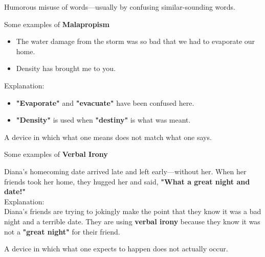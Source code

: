 \begin{definition}[Malapropism]
    Humorous misuse of words—usually by confusing similar-sounding words.
\end{definition}

\begin{example}
    Some examples of \textbf{Malapropism}
    
    \begin{itemize}
        \item The water damage from the storm was so bad that we had to evaporate our home.
        \item Density has brought me to you. \\
    \end{itemize}
    
    Explanation: \\
    
    \begin{itemize}
        \item \textbf{"Evaporate"} and \textbf{"evacuate"} have been confused here.
        \item \textbf{"Density"} is used when \textbf{"destiny"} is what was meant.
    \end{itemize}
\end{example}

\begin{definition}
    A device in which what one means does not match what one says.
\end{definition}

\begin{example}
    Some examples of \textbf{Verbal Irony}
    
    Diana's homecoming date arrived late and left early—without her. When her
    friends took her home, they hugged her and said, \textbf{"What a great
    night and date!"} \\
    
    Explanation: \\
    
    Diana's friends are trying to jokingly make the point that they know it was
    a bad night and a terrible date. They are using \textbf{verbal irony}
    because they know it was not a \textbf{"great night"} for their friend.
\end{example}

\begin{definition}
    A device in which what one expects to happen does not actually occur.
\end{definition}


